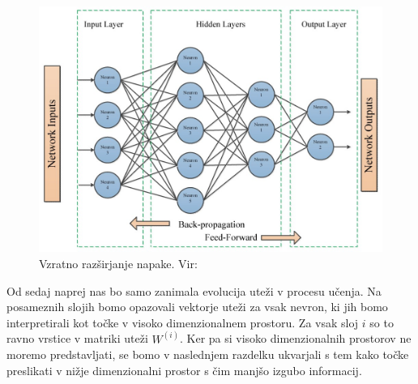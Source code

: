 \begin{figure}[H]
    \centering
    \includegraphics[width=0.7\linewidth]{slike/backpropagation.jpeg}
    \caption{Vzratno razširjanje napake. Vir: \cite{electronics10212689}}
    \label{fig:backprop}
\end{figure}

Od sedaj naprej nas bo samo zanimala evolucija uteži v procesu učenja. Na posameznih slojih bomo opazovali vektorje uteži za vsak nevron, ki jih bomo interpretirali kot točke v visoko dimenzionalnem prostoru. Za vsak sloj $i$ so to  ravno vrstice v matriki uteži $W^{(i)}$. Ker pa si visoko dimenzionalnih prostorov ne moremo predstavljati, se bomo v naslednjem razdelku ukvarjali s tem kako točke preslikati v nižje dimenzionalni prostor s čim manjšo izgubo informacij.
